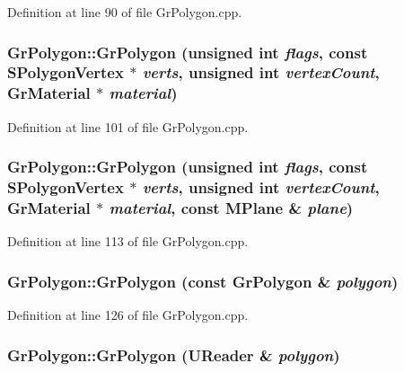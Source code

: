 \begin{CompactItemize}
Definition at line 90 of file GrPolygon.cpp.\hypertarget{class_gr_polygon_8d47174424c6d59868900ca0a8707df2}{
\subsubsection[{GrPolygon}]{\setlength{\rightskip}{0pt plus 5cm}GrPolygon::GrPolygon (unsigned int {\em flags}, \/  const {\bf SPolygonVertex} $\ast$ {\em verts}, \/  unsigned int {\em vertexCount}, \/  {\bf GrMaterial} $\ast$ {\em material})}}
\label{class_gr_polygon_8d47174424c6d59868900ca0a8707df2}




Definition at line 101 of file GrPolygon.cpp.\hypertarget{class_gr_polygon_96d02ce6472ab3c9f0432a1bf5b20080}{
\subsubsection[{GrPolygon}]{\setlength{\rightskip}{0pt plus 5cm}GrPolygon::GrPolygon (unsigned int {\em flags}, \/  const {\bf SPolygonVertex} $\ast$ {\em verts}, \/  unsigned int {\em vertexCount}, \/  {\bf GrMaterial} $\ast$ {\em material}, \/  const {\bf MPlane} \& {\em plane})}}
\label{class_gr_polygon_96d02ce6472ab3c9f0432a1bf5b20080}




Definition at line 113 of file GrPolygon.cpp.\hypertarget{class_gr_polygon_1af2b8f57b49002d6918ebc9ccb97a86}{
\subsubsection[{GrPolygon}]{\setlength{\rightskip}{0pt plus 5cm}GrPolygon::GrPolygon (const {\bf GrPolygon} \& {\em polygon})}}
\label{class_gr_polygon_1af2b8f57b49002d6918ebc9ccb97a86}




Definition at line 126 of file GrPolygon.cpp.\hypertarget{class_gr_polygon_17a0c25129aef4a4b9da2a7190cc0a52}{
\subsubsection[{GrPolygon}]{\setlength{\rightskip}{0pt plus 5cm}GrPolygon::GrPolygon ({\bf UReader} \& {\em polygon})}}
\label{class_gr_polygon_17a0c25129aef4a4b9da2a7190cc0a52}





\end{CompactItemize}
